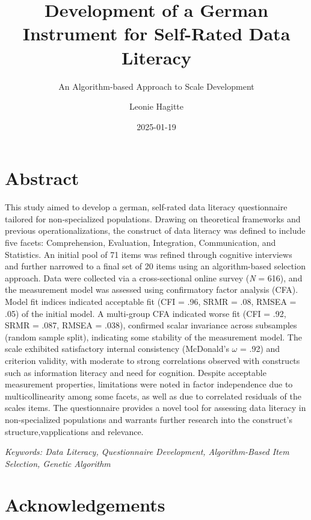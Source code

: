 \documentclass[
  12pt,
  a4paper,
  twoside]{article}
\title{Development of a German Instrument for Self-Rated Data Literacy}
\subtitle{An Algorithm-based Approach to Scale Development}
\author{Leonie Hagitte}
\date{2025-01-19}
\begin{document}
\maketitle

{
\setcounter{tocdepth}{2}
\tableofcontents
}
\newpage\null\thispagestyle{empty}\newpage

\section*{Abstract}\label{abstract}

This study aimed to develop a german, self-rated data literacy questionnaire tailored for non-specialized populations. Drawing on theoretical frameworks and previous operationalizations, the construct of data literacy was defined to include five facets: Comprehension, Evaluation, Integration, Communication, and Statistics. An initial pool of 71 items was refined through cognitive interviews and further narrowed to a final set of 20 items using an algorithm-based selection approach. Data were collected via a cross-sectional online survey (\emph{N} = 616), and the measurement model was assessed using confirmatory factor analysis (CFA). Model fit indices indicated acceptable fit (CFI = .96, SRMR = .08, RMSEA = .05) of the initial model. A multi-group CFA indicated worse fit (CFI = .92, SRMR = .087, RMSEA = .038), confirmed scalar invariance across subsamples (random sample split), indicating some stability of the measurement model. The scale exhibited satisfactory internal consistency (McDonald's \(\omega\) = .92) and criterion validity, with moderate to strong correlations observed with constructs such as information literacy and need for cognition. Despite acceptable measurement properties, limitations were noted in factor independence due to multicollinearity among some facets, as well as due to correlated residuals of the scales items. The questionnaire provides a novel tool for assessing data literacy in non-specialized populations and warrants further research into the construct's structure,vapplications and relevance.

\emph{Keywords: Data Literacy, Questionnaire Development, Algorithm-Based Item Selection, Genetic Algorithm}

\section*{Acknowledgements}\label{acknowledgements}
\end{document}
